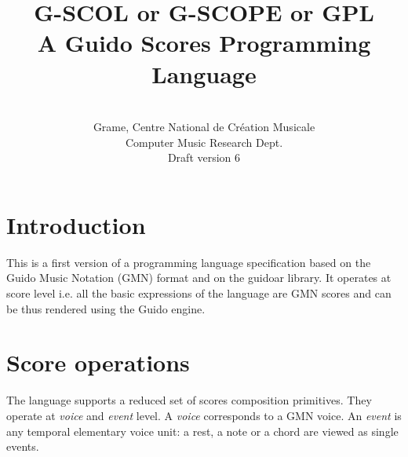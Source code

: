 \documentclass[10pt,a4paper,frenchb]{article}
\begin{document}
\title{\textbf{\textsc{G-SCOL}} or \textbf{\textsc{G-SCOPE}} or \textbf{\textsc{GPL}} \\
A Guido Scores Programming Language}


\author{
\\
Grame, Centre National de Création Musicale \\
Computer Music Research Dept.\\
Draft version 6
}

\maketitle

\section{Introduction}

This is a first version of a programming language specification based on the Guido Music Notation (GMN) format and on the guidoar library. It operates at score level i.e. all the basic expressions of the language are GMN scores and can be thus rendered using the Guido engine. 


\section{Score operations}

The language supports a reduced set of scores composition primitives.
They operate at \emph{voice} and \emph{event} level. 
A \emph{voice} corresponds to a GMN voice.
An \emph{event} is any temporal elementary voice unit: a rest, a note or a chord are viewed as single events.
\end{document}

